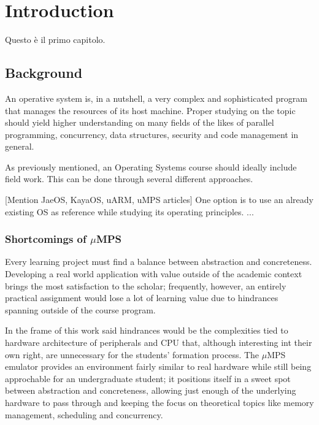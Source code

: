\documentclass[12pt,a4paper,openright,twoside]{report}
\begin{document}
\chapter{Introduction}                %
\lhead[\fancyplain{}{\bfseries\thepage}]{\fancyplain{}{\bfseries\rightmark}}
Questo \`e il primo capitolo.
\section{Background}
An operative system is, in a nutshell, a very complex and sophisticated program
that manages the resources of its host machine. Proper studying on the topic 
should yield higher understanding on many fields of the likes of
parallel programming, concurrency, data structures, security and 
code management in general.

As previously mentioned, an Operating Systems course should ideally include
field work. This can be done through several different approaches.

[Mention JaeOS, KayaOS, uARM, uMPS articles]
One option is to use an already existing OS as reference while studying 
its operating principles. 
...

\subsection{Shortcomings of $\mu$MPS}
Every learning project must find a balance between abstraction and concreteness.
Developing a real world application with value outside of the academic context
 brings the most satisfaction to the scholar; frequently, however, an entirely
 practical assignment would lose a lot of learning value due to hindrances
 spanning outside of the course program.
 
In the frame of this work said hindrances would be the complexities tied to
hardware architecture of peripherals and CPU that, although interesting
int their own right, are unnecessary for the students' formation process.
The $\mu$MPS emulator provides an environment fairly similar to real hardware
while still being approchable for an undergraduate student; it positions itself
in a sweet spot between abstraction and concreteness, allowing just enough
of the underlying hardware to pass through and keeping the focus on 
theoretical topics like memory management, scheduling and concurrency.
\end{document}
